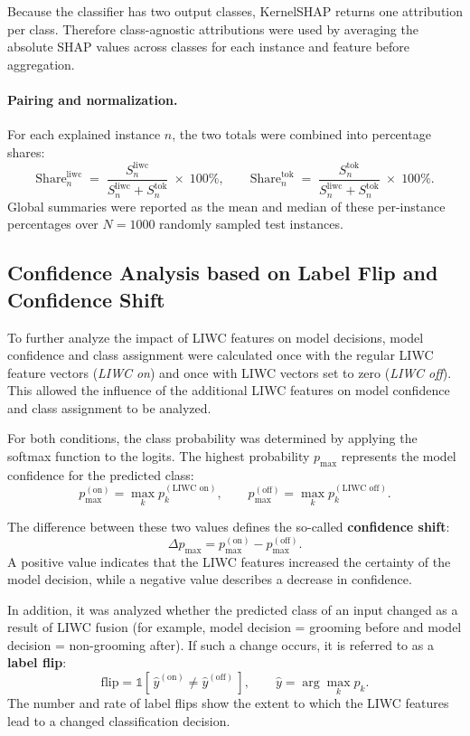 Because the classifier has two output classes, KernelSHAP returns one attribution per class. Therefore class-agnostic attributions were used by averaging the absolute SHAP values across classes for each instance and feature before aggregation.

\paragraph{Pairing and normalization.}
For each explained instance \(n\), the two totals were combined into percentage shares:
\[
\mathrm{Share}^{\mathrm{liwc}}_{n}
\;=\;
\frac{S^{\mathrm{liwc}}_{n}}{S^{\mathrm{liwc}}_{n}+S^{\mathrm{tok}}_{n}}
\;\times\;100\%,
\qquad
\mathrm{Share}^{\mathrm{tok}}_{n}
\;=\;
\frac{S^{\mathrm{tok}}_{n}}{S^{\mathrm{liwc}}_{n}+S^{\mathrm{tok}}_{n}}
\;\times\;100\% .
\]
Global summaries were reported as the mean and median of these per-instance percentages over \(N=1000\) randomly sampled test instances.


\subsection{Confidence Analysis based on Label Flip and Confidence Shift}

To further analyze the impact of LIWC features on model decisions, model confidence and class assignment were calculated once with the regular LIWC feature vectors (\emph{LIWC on}) and once with LIWC vectors set to zero (\emph{LIWC off}). This allowed the influence of the additional LIWC features on model confidence and class assignment to be analyzed.

For both conditions, the class probability was determined by applying the softmax function to the logits. The highest probability \(p_{\max}\) represents the model confidence for the predicted class:
\[
p_{\max}^{(\text{on})} = \max_k p_k^{(\text{LIWC on})}, \qquad
p_{\max}^{(\text{off})} = \max_k p_k^{(\text{LIWC off})}.
\]

The difference between these two values defines the so-called \textbf{confidence shift}:
\[
\Delta p_{\max} = p_{\max}^{(\text{on})} - p_{\max}^{(\text{off})}.
\]
A positive value indicates that the LIWC features increased the certainty of the model decision, while a negative value describes a decrease in confidence.

In addition, it was analyzed whether the predicted class of an input changed as a result of LIWC fusion (for example, model decision = grooming before and model decision = non-grooming after). If such a change occurs, it is referred to as a \textbf{label flip}:
\[
\text{flip} = \mathbb{1}\!\left[\,\hat{y}^{(\text{on})} \neq \hat{y}^{(\text{off})}\,\right], 
\qquad
\hat{y} = \arg\max_k p_k.
\]
The number and rate of label flips show the extent to which the LIWC features lead to a changed classification decision.


